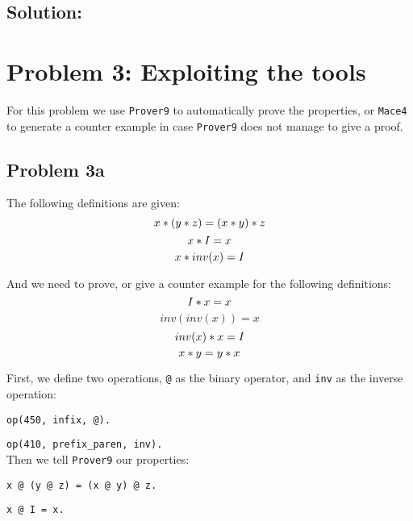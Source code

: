 \documentclass[a4paper]{article}
\begin{document}
	\subsection*{Solution:}
	
	
	\section*{Problem 3: Exploiting the tools}
	For this problem we use {\tt Prover9} to automatically prove the properties, or {\tt Mace4} to generate a counter example in case {\tt Prover9} does not manage to give a proof.
	
	\subsection*{Problem 3a}
	The following definitions are given:
	$$ x \** (y \** z) = (x \** y) \** z$$
	$$x \** I = x$$
	$$x \** inv(x) = I$$
	
	And we need to prove, or give a counter example for the following definitions:
	$$I \** x = x$$
	$$inv(inv(x)) = x$$
	$$inv(x) \** x = I$$ 
	$$x \** y = y \** x$$
	
	First, we define two operations, {\tt @} as the binary operator, and {\tt inv} as the inverse operation:
	
	{\tt op(450, infix, @). }
	
	{\tt op(410, prefix\_paren, inv).}\\
	
	Then we tell {\tt Prover9} our properties: 
	
	{\tt x @ (y @ z) = (x @ y) @ z.}
	
	{\tt x @ I = x.}
	 
\end{document}
